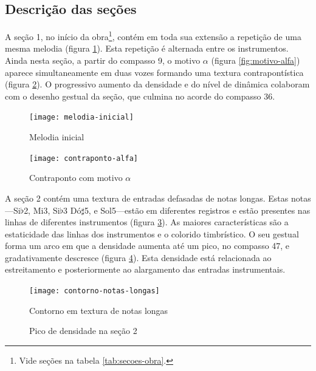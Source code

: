 \subsection{Descrição das seções}
\label{sec:descricao-das-secoes}


A seção 1, no início da obra\footnote{Vide seções na tabela
  \ref{tab:secoes-obra}.}, contém em toda sua extensão a repetição de
uma mesma melodia (figura \ref{fig:melodia-inicial}). Esta repetição é
alternada entre os instrumentos. Ainda nesta seção, a partir do
compasso 9, o motivo $\alpha$ (figura \ref{fig:motivo-alfa}) aparece
simultaneamente em duas vozes formando uma textura contrapontística
(figura \ref{fig:contraponto-alfa}). O progressivo aumento da
densidade e do nível de dinâmica colaboram com o desenho gestual da
seção, que culmina no acorde do compasso 36.

\begin{figure}
  \centering
  \texttt{[image: melodia-inicial]}
  \caption{Melodia inicial}
  \label{fig:melodia-inicial}
\end{figure}

\begin{figure}
  \centering
  \texttt{[image: contraponto-alfa]}
  \caption{Contraponto com motivo $\alpha$}
  \label{fig:contraponto-alfa}
\end{figure}

A seção 2 contém uma textura de entradas defasadas de notas
longas. Estas notas---Si$\flat$2, Mi3, Si$\flat$3 Dó$\sharp$5, e
Sol5---estão em diferentes registros e estão presentes nas linhas de
diferentes instrumentos (figura \ref{fig:contorno-notas-longas}). As
maiores características são a estaticidade das linhas dos instrumentos
e o colorido timbrístico. O seu gestual forma um arco em que a
densidade aumenta até um pico, no compasso 47, e gradativamente
descresce (figura \ref{fig:pico-densidade-secao-2}). Esta densidade
está relacionada ao estreitamento e posteriormente ao alargamento das
entradas instrumentais.

\begin{figure}
  \centering
  \texttt{[image: contorno-notas-longas]}
  \caption{Contorno em textura de notas longas}
  \label{fig:contorno-notas-longas}
\end{figure}

\begin{figure}
  \centering
  \caption{Pico de densidade na seção 2}
  \label{fig:pico-densidade-secao-2}
\end{figure}

